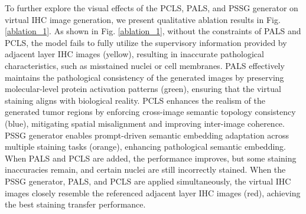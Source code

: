 \documentclass[journal,twoside,web]{ieeecolor}
\begin{document}
To further explore the visual effects of the PCLS, PALS, and PSSG generator  on virtual IHC image generation, we present qualitative ablation results in Fig. \ref{ablation_1}. As shown in Fig. \ref{ablation_1}, without the constraints of PALS and PCLS, the model fails to fully utilize the supervisory information provided by adjacent layer IHC images (yellow), resulting in inaccurate pathological characteristics, such as misstained nuclei or cell membranes. PALS effectively maintains the pathological consistency of the generated images by preserving molecular-level protein activation patterns (green), ensuring that the virtual staining aligns with biological reality. PCLS enhances the realism of the generated tumor regions by enforcing cross-image semantic topology consistency (blue), mitigating spatial misalignment and improving inter-image coherence. PSSG generator enables prompt-driven semantic embedding adaptation across multiple staining tasks (orange), enhancing pathological semantic embedding. When PALS and PCLS are added, the performance improves, but some staining inaccuracies remain, and certain nuclei are still incorrectly stained. When the PSSG generator, PALS, and PCLS are applied simultaneously, the virtual IHC images closely resemble the referenced adjacent layer IHC images (red), achieving the best staining transfer performance.




\end{document}
